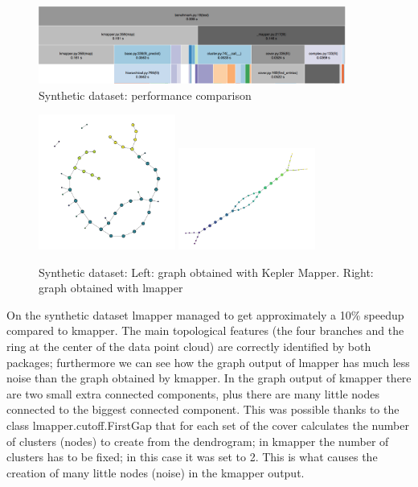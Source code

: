 \begin{figure}[h]
	\caption{Synthetic dataset: performance comparison}
	\centering
	\includegraphics[width=0.9\textwidth]{images/benchmark/synthetic/benchmark}
\end{figure}
\begin{figure}[h!]
	\caption{Synthetic dataset: Left: graph obtained with Kepler Mapper. Right: graph obtained with lmapper}
	\centering
	\includegraphics[width=0.4\textwidth]{images/benchmark/synthetic/benchmark_kmapper}
	\includegraphics[width=0.4\textwidth]{images/benchmark/synthetic/benchmark_lmapper}
\end{figure}


On the synthetic dataset lmapper managed to get approximately a 10\% speedup compared to kmapper. The main topological features (the four branches and the ring at the center of the data point cloud) are correctly identified by both packages; furthermore we can see how the graph output of lmapper has much less noise than the graph obtained by kmapper. In the graph output of kmapper there are two small extra connected components, plus there are many little nodes connected to the biggest connected component. This was possible thanks to the class lmapper.cutoff.FirstGap that for each set of the cover calculates the number of clusters (nodes) to create from the dendrogram; in kmapper the number of clusters has to be fixed; in this case it was set to 2. This is what causes the creation of many little nodes (noise) in the kmapper output.

